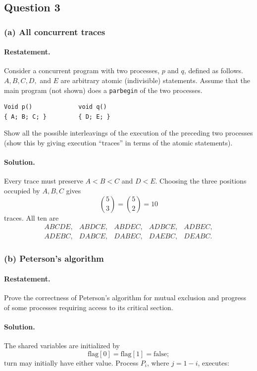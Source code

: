 \subsection*{Question 3}

\subsubsection*{(a) All concurrent traces}

\paragraph{Restatement.}
Consider a concurrent program with two processes, \(p\) and \(q\),
defined as follows.  \(A,B,C,D,\) and \(E\) are arbitrary atomic
(indivisible) statements.  Assume that the main program (not shown)
does a \texttt{parbegin} of the two processes.
\begin{verbatim}
Void p()             void q()
{ A; B; C; }         { D; E; }
\end{verbatim}
Show all the possible interleavings of the execution of the preceding
two processes (show this by giving execution ``traces'' in terms of the
atomic statements).

\paragraph{Solution.}
Every trace must preserve \(A<B<C\) and \(D<E\).  Choosing the three
positions occupied by \(A,B,C\) gives
\[
\binom{5}{3}=\binom{5}{2}=10
\]
traces.  All ten are
\[
\begin{array}{lllll}
ABCDE, & ABDCE, & ABDEC, & ADBCE, & ADBEC,\\
ADEBC, & DABCE, & DABEC, & DAEBC, & DEABC.
\end{array}
\]

\subsubsection*{(b) Peterson's algorithm}

\paragraph{Restatement.}
Prove the correctness of Peterson's algorithm for mutual exclusion and
progress of some processes requiring access to its critical section.

\paragraph{Solution.}
The shared variables are initialized by
\[
\mathrm{flag}[0]=\mathrm{flag}[1]=\mathrm{false};
\]
\(\mathrm{turn}\) may initially have either value.  Process \(P_i\),
where \(j=1-i\), executes:

